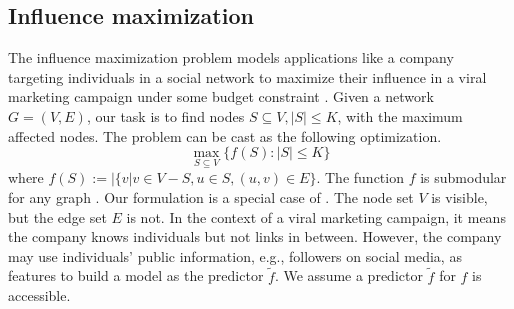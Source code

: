 








\subsection{Influence maximization} \label{subsec:influence-maximization}


The influence maximization problem models applications like a company targeting individuals in a social network to maximize their influence in a viral marketing campaign under some budget constraint \cite {kempe2003maximizing, bogunovic2017robust, banihashem2023dynamic}. Given a network $G = (V, E)$, our task is to find nodes $S \subseteq V, |S| \leq K$, with the maximum affected nodes. The problem can be cast as the following optimization. 
\[ \max_{S \subseteq V} \{f(S) : |S| \leq K \} \]
where $f(S) := |\{ v| v \in V - S, u \in S, (u, v) \in E \}$. 
The function $f$ is submodular for any graph \cite{mossel2010submodularity}. Our formulation is a special case of \cite{kempe2003maximizing}. The node set $V$ is visible, but the edge set $E$ is not. In the context of a viral marketing campaign, it means the company knows individuals but not links in between. However, the company may use individuals' public information, e.g., followers on social media, as features to build a model as the predictor $\tilde{f}$. We assume a predictor $\tilde{f}$ for $f$ is accessible. 


